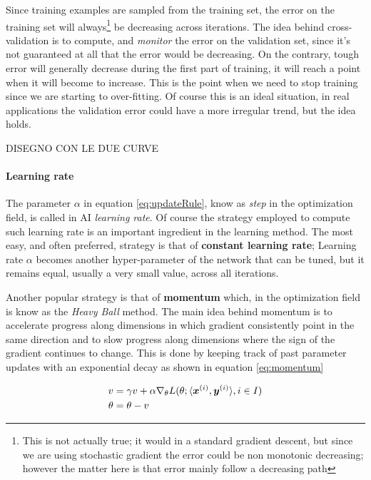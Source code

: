Since training examples are sampled from the training set, the error on the training set will always\footnote{This is not actually true; it would in a standard gradient descent, but since we are using stochastic gradient the error could be non monotonic decreasing; however the matter here is that error mainly follow a decreasing path} be decreasing across iterations. The idea behind cross-validation is to compute, and \textit{monitor} the error on the validation set, since it's not guaranteed at all that the error would be decreasing. On the contrary, tough error will generally decrease during the first part of training, it will reach a point when it will become to increase. This is the point when we need to stop training since we are starting to over-fitting. Of course this is an ideal situation, in real applications the validation error could have a more irregular trend, but the idea holds.


DISEGNO CON LE DUE CURVE



\paragraph{Learning rate}

The parameter $\alpha$ in equation \ref{eq:updateRule}, know as \textit{step} in the optimization field, is called in AI \textit{learning rate}. Of course the strategy employed to compute such learning rate is an important ingredient in the learning method.
The most easy, and often preferred, strategy is that of \textbf{constant learning rate}; Learning rate $\alpha$ becomes another hyper-parameter of the network that can be tuned, but it remains equal, usually a very small value, across all iterations.

Another popular strategy is that of \textbf{momentum} which, in the optimization field is know as the \textit{Heavy Ball} method.
The main idea behind momentum is to accelerate progress along dimensions
in which gradient consistently point in the same direction
and to slow progress along dimensions where the sign
of the gradient continues to change. This is done by keeping
track of past parameter updates with an exponential decay as shown in equation \ref{eq:momentum}

\begin{align}
v &= \gamma v+ \alpha \nabla_\theta L(\theta; \langle\boldsymbol{x}^{(i)},\boldsymbol{y}^{(i)}\rangle, i\in I)\\
\theta &= \theta - v
\label{eq:momentum}
\end{align}

